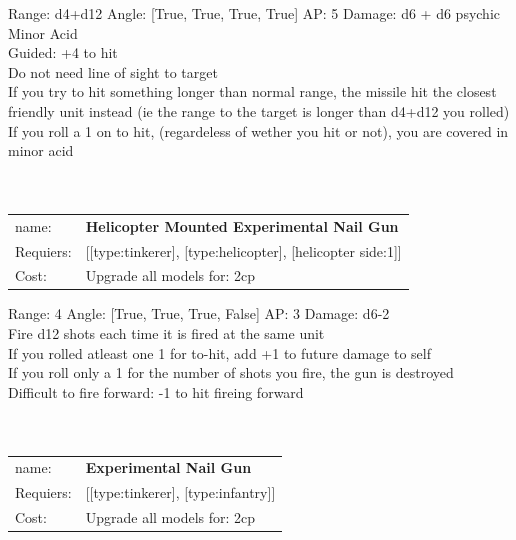 Range: d4+d12  Angle: [True, True, True, True] AP: 5 Damage: d6 + d6 psychic \\
Minor Acid\\ 
Guided: +4 to hit\\ 
Do not need line of sight to target\\ 
If you try to hit something longer than normal range, the missile hit the closest friendly unit instead (ie the range to the target is longer than d4+d12 you rolled)\\ 
If you roll a 1 on to hit, (regardeless of wether you hit or not), you are covered in minor acid\\ 








\ \\
\ \\
\begin{tabular}{ll}
name: & {\bf Helicopter Mounted Experimental Nail Gun } \\
Requiers: & [[type:tinkerer], [type:helicopter], [helicopter side:1]] \\
Cost: & Upgrade all models for: 2cp \\
\end{tabular}



Range: 4  Angle: [True, True, True, False] AP: 3 Damage: d6-2 \\
Fire d12 shots each time it is fired at the same unit\\ 
If you rolled atleast one 1 for to-hit, add +1 to future damage to self\\ 
If you roll only a 1 for the number of shots you fire, the gun is destroyed\\ 
Difficult to fire forward: -1 to hit fireing forward\\ 








\ \\
\ \\
\begin{tabular}{ll}
name: & {\bf Experimental Nail Gun } \\
Requiers: & [[type:tinkerer], [type:infantry]] \\
Cost: & Upgrade all models for: 2cp \\
\end{tabular}



